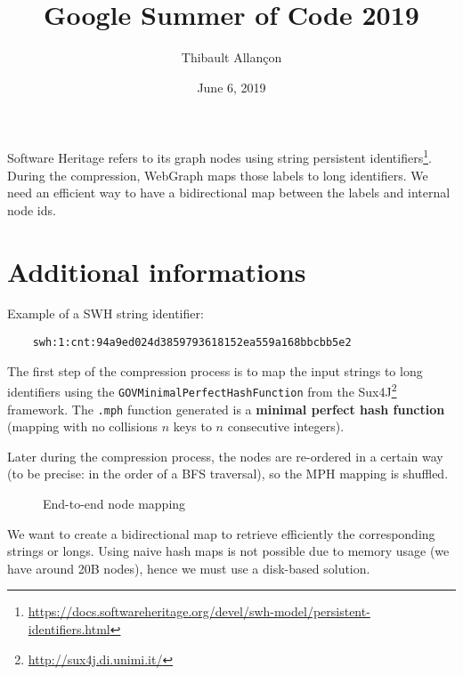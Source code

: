 \documentclass[11pt,a4paper]{article}
\title{Google Summer of Code 2019}
\author{Thibault Allançon}
\date{June 6, 2019}
\begin{document}
\maketitle

Software Heritage refers to its graph nodes using string persistent
identifiers\footnote{\url{https://docs.softwareheritage.org/devel/swh-model/persistent-identifiers.html}}.
During the compression, WebGraph maps those labels to long identifiers. We need
an efficient way to have a bidirectional map between the labels and internal
node ids.

\section{Additional informations}

Example of a SWH string identifier:

\begin{verbatim}
    swh:1:cnt:94a9ed024d3859793618152ea559a168bbcbb5e2
\end{verbatim}

The first step of the compression process is to map the input strings to long
identifiers using the \texttt{GOVMinimalPerfectHashFunction} from the
Sux4J\footnote{\url{http://sux4j.di.unimi.it/}} framework. The
\texttt{.mph} function generated is a \textbf{minimal perfect hash
function} (mapping with no collisions $n$ keys to $n$ consecutive integers).

Later during the compression process, the nodes are re-ordered in a certain way
(to be precise: in the order of a BFS traversal), so the MPH mapping is
shuffled.

\begin{figure}[H]
    \centering
    \caption{End-to-end node mapping}
\end{figure}

We want to create a bidirectional map to retrieve efficiently the corresponding
strings or longs. Using naive hash maps is not possible due to memory usage (we
have around 20B nodes), hence we must use a disk-based solution.
\end{document}
